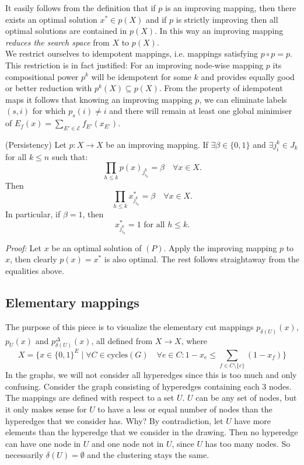 It easily follows from the definition that if $p$ is an improving mapping, then there exists an optimal solution $x^* \in p(X)$ and if $p$ is strictly improving then all optimal solutions are contained in $p(X)$. In this way an improving mapping \textit{reduces the search space} from $X$ to $p(X)$. \\ We restrict ourselves to idempotent mappings, i.e. mappings satisfying $p \circ p=p$. This restriction is in fact justified: For an improving node-wise mapping $p$ its compositional power $p^k$ will be idempotent for some $k$ and provides equally good or better reduction with $p^k(X) \subseteq p(X)$. From the property of idempotent maps it follows that knowing an improving mapping $p$, we can eliminate labels $(s,i)$ for which $p_s(i) \neq i$ and there will remain at least one global minimiser of $E_f(x)=\sum_{E' \in \mathcal{E}} f_{E'}(x_{E'})$. 



\begin{lemma}{(Persistency)}
Let $p: X \rightarrow X$ be an improving mapping. If $\exists \beta \in \{0,1\}$ and $\exists j^k_i \in J_k$ for all $k \leq n$ such that: \[\prod_{h \leq k} p(x)_{j^k_{i_h}} = \beta \quad \forall x \in X.\]
Then \[\prod_{h \leq k} x^*_{j^k_{i_h}} = \beta \quad \forall x \in X.\] In particular, if $\beta=1$, then \[ x^*_{j^k_{i_h}}=1 \text{ for all } h \leq k. \] 
\end{lemma}
\textit{Proof:} Let $x$ be an optimal solution of $(P)$. Apply the improving mapping $p$ to $x$, then clearly $p(x)=x^*$ is also optimal. The rest follows straightaway from the equalities above.  


\subsection{Elementary mappings}

The purpose of this piece is to visualize the elementary cut mappings $p_{\delta(U)}(x)$, $p_U(x)$ and $p^{\Delta}_{\delta(U)}(x)$, all defined from $X \to X$, where 
\begin{equation}
    X=\Bigg\{ x \in \{0,1\}^E \mid
   \forall C \in \text{cycles}(G) \quad \forall e \in C: 1-x_e \leq \sum_{f \in C \setminus \{e \}} (1-x_f) \Bigg\}
\end{equation}
In the graphs, we will not consider all hyperedges since this is too much and only confusing. Consider the graph consisting of hyperedges containing each 3 nodes. 
The mappings are defined with respect to a set $U$. $U$ can be any set of nodes, but it only makes sense for $U$ to have a less or equal number of nodes than the hyperedges that we consider has. Why? By contradiction, let $U$ have more elements than the hyperedge that we consider in the drawing. Then no hyperedge can have one node in $U$ and one node not in $U$, since $U$ has too many nodes. So necessarily $\delta(U)=\emptyset$ and the clustering stays the same. 


